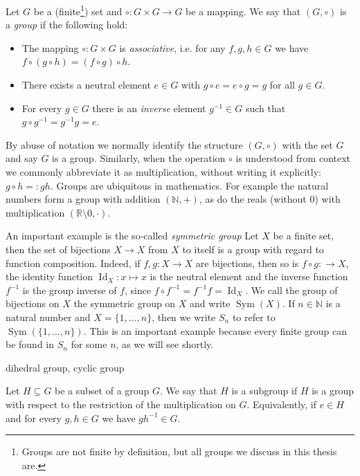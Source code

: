 Let $G$ be a (finite\footnote{Groups are not finite by definition, but all groups we discuss in this thesis are.}) set and $ \circ : G \times G \rightarrow G$ be a mapping. 
We say that $(G, \circ)$ is a \emph{group} if the following hold:
\begin{itemize}
\item The mapping $\circ : G \times G$ is \emph{associative}, i.e. for any $f,g,h \in G$ we have $f \circ (g \circ h) = (f \circ g) \circ h$.
\item There exists a neutral element $e \in G$ with $g \circ e = e \circ g = g$ for all $g \in G$.
\item For every $g \in G$ there is an \emph{inverse} element $g^{-1} \in G$ such that $g \circ g^{-1} = g^{-1} g = e$.
\end{itemize}
By abuse of notation we normally identify the structure $(G,\circ)$ with the set $G$ and say $G$ is a group.
Similarly, when the operation $\circ$ is understood from context we commonly abbreviate it as multiplication, without writing it explicitly: $g \circ h =: gh$.
Groups are ubiquitous in mathematics. For example the natural numbers form a group with addition $(\mathbb{N},+)$, as do the reals (without 0) with multiplication $(\mathbb{R}\setminus{0},\cdot)$.

An important example is the so-called \emph{symmetric group}
Let $X$ be a finite set, then the set of bijections $X \rightarrow X$ from $X$ to itself is a group with regard to function composition.
Indeed, if $f,g : X \rightarrow X$ are bijections, then so is $f \circ g :  \rightarrow X$, the identity function $\operatorname{Id}_X : x \mapsto x$ is the neutral element and the inverse function $f^{-1}$ is the group inverse of $f$,
since $f \circ f^{-1} = f^{-1} f = \operatorname{Id}_X.$ We call the group of bijections on $X$ the symmetric group on $X$ and write $\operatorname{Sym}(X)$.
If $n \in \mathbb{N}$ is a natural number and $X = \{ 1 ,\ldots, n \}$, then we write $S_n$ to refer to $\operatorname{Sym}(\{1,\ldots,n\}).$
This is an important example because every finite group can be found in $S_n$ for some $n$, as we will see shortly.

dihedral group, cyclic group

Let $H \subseteq G$ be a subset of a group $G$.
We say that $H$ is a subgroup if $H$ is a group with respect to the restriction of the multiplication on $G$.
Equivalently, if $e \in H$ and for every $g, h \in G$ we have $g h^{-1} \in G$.


